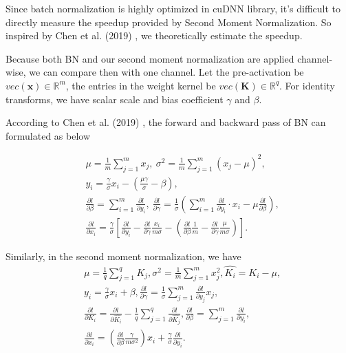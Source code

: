 \documentclass[10pt,journal,compsoc]{IEEEtran}
\newcommand{\modify}[1]{{ #1}}
\begin{document}
\modify{

Since batch normalization is highly optimized in cuDNN library, it's difficult to directly measure the speedup provided by Second Moment Normalization. So inspired by Chen et al. (2019) \cite{chen2019effective}, we theoretically estimate the speedup.

Because both BN\cite{ioffe2015batch} and our second moment normalization are applied channel-wise, we can compare then with one channel. Let the pre-activation be $vec(\mathbf{x})\in\mathbb{R}^{m}$, the entries in the weight kernel be $vec(\mathbf{K})\in \mathbb{R}^{q}$. For identity transforms, we have scalar scale and bias coefficient $\gamma$ and $\beta$.

According to Chen et al. (2019) \cite{chen2019effective}, the forward and backward pass of BN can formulated as below
\begin{small}
\begin{equation}
    \label{equ:eff_BN}
    \begin{split}
        & \mu=\frac{1}{m}\sum_{j=1}^mx_j ,~\sigma^2 =  \frac{1}{m}\sum_{j=1}^m(x_j -\mu )^2,\\
        & y_i = \frac{\gamma }{\sigma }x_i - \left(\frac{\mu \gamma }{\sigma } - \beta \right),\\
        & \frac{\partial l}{\partial \beta } = \sum_{i=1}^m \frac{\partial l}{\partial y_i },~\frac{\partial l}{\partial \gamma }  =  \frac{1}{\sigma } \left( \sum_{i=1}^m \frac{\partial l}{\partial y_i } \cdot x_i  -  \mu \frac{\partial l}{\partial \beta } \right),\\
        & \frac{\partial l}{\partial x_i } = \frac{\gamma }{\sigma } \left[ \frac{\partial l}{\partial y_i } - \frac{\partial l}{\partial \gamma } \frac{x_i }{m\sigma } - \left(\frac{\partial l}{\partial \beta } \frac{1}{m} - \frac{\partial l}{\partial \gamma } \frac{\mu }{m\sigma } \right) \right].
    \end{split}
\end{equation}
\end{small}
Similarly, in the second moment normalization, we have
\begin{equation}
    \begin{split}
        & \mu = \frac{1}{q}\sum_{j=1}^q K_j, \sigma^2 = \frac{1}{m}\sum_{j=1}^m x_j^2, \hat{K_i} = K_i - \mu,\\
        & y_i = \frac{\gamma}{\sigma}x_i + \beta, \frac{\partial l}{\partial \gamma} = \frac{1}{\sigma}\sum_{j=1}^m \frac{\partial l}{\partial y_j}x_j,\\
        & \frac{\partial l}{\partial K_i}=\frac{\partial l}{\partial \hat{K_i}} - \frac{1}{q}\sum_{j=1}^q\frac{\partial l}{\partial \hat{K_j}}, \frac{\partial l}{\partial \beta} = \sum_{j=1}^m\frac{\partial l}{\partial y_i},\\
        & \frac{\partial l}{\partial x_i} = (\frac{\partial l}{\partial \beta}\frac{\gamma}{m\sigma^2})x_i + \frac{\gamma}{\sigma}\frac{\partial l}{\partial y_i}.
    \end{split}
\end{equation}

}
\end{document}
